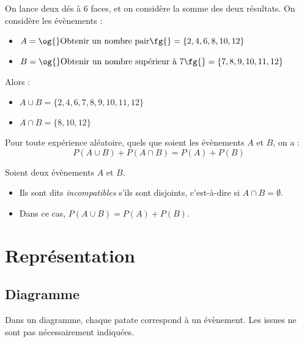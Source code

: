 \begin{exemple}On lance deux dés à 6 faces, et on considère la somme des deux résultats. On considère les évènements :
  \begin{itemize}
    \item $A=\text{\og{}Obtenir un nombre pair\fg{}}=\{2, 4, 6, 8, 10, 12\}$
    \item $B=\text{\og{}Obtenir un nombre supérieur à 7\fg{}}=\{7, 8, 9, 10, 11, 12\}$
  \end{itemize}

  Alors :

  \begin{itemize}
    \item $A\cup B=\{2, 4, 6, 7, 8, 9, 10, 11, 12\}$
    \item $A\cap B=\{8, 10, 12\}$
  \end{itemize}
\end{exemple}

\begin{propriete}
  Pour toute expérience aléatoire, quels que soient les évènements $A$ et $B$,
  on a :
  \[P(A\cup B) + P(A\cap B) = P(A) + P(B)\]
\end{propriete}

\begin{defprop}Soient deux évènements $A$ et $B$.
  \begin{itemize}
    \item Ils sont dits \emph{incompatibles} s'ils sont disjoints, c'est-à-dire si $A\cap B=\emptyset$.
    \item Dans ce cas, $P(A\cup B)=P(A)+P(B)$.
  \end{itemize}
\end{defprop}

\section{Représentation}

\subsection{Diagramme}

\begin{desc}
  Dans un diagramme, chaque \og{}patate\fg{} correspond à un évènement. Les issues
  ne sont pas nécessairement indiquées.
\end{desc}

